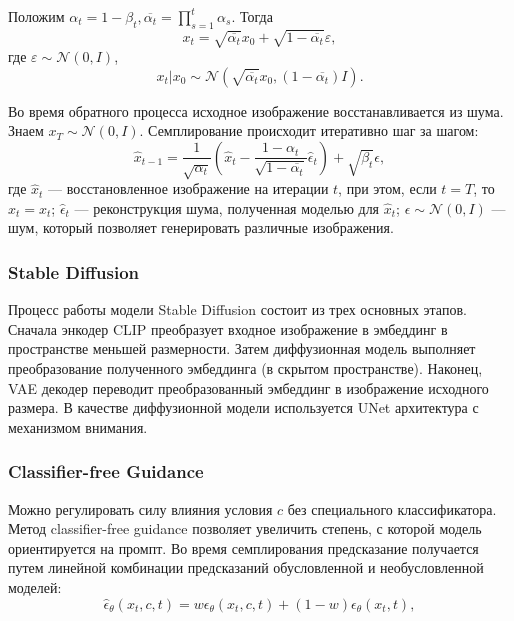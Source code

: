 \documentclass{article}
\begin{document}
Положим $\alpha_t=1-\beta_t, \overline{\alpha_t} = \prod\limits_{s = 1}^t\alpha_s$. Тогда 
\begin{equation}
x_t = \sqrt{\overline{\alpha_t}}x_0+\sqrt{1-\overline{\alpha_t}}\varepsilon,
\end{equation}
где $\varepsilon \sim \mathcal{N}(0, I)$, 
\begin{equation}
x_t|x_0 \sim \mathcal{N}(\sqrt{\overline{\alpha_t}}x_0, (1-\overline{\alpha_t}) I).
\end{equation}

Во время обратного процесса исходное изображение восстанавливается из шума. Знаем $x_T\sim \mathcal{N}(0, I)$. Семплирование происходит итеративно шаг за шагом:
\begin{equation}
\hat{x}_{t-1} = \frac{1}{\sqrt{\alpha_t}}\left( \hat{x}_t - \frac{1-\alpha_t}{\sqrt{1-\overline{\alpha_t}}}\hat{\epsilon}_t\right) + \sqrt{\beta_t}\epsilon,
\end{equation}
где $\hat{x}_t$ --- восстановленное изображение на итерации $t$, при этом, если $t = T$, то $\hat{x}_t = x_t$; $\hat{\epsilon}_t$ --- реконструкция шума, полученная моделью для $\hat{x}_t$; $\epsilon \sim \mathcal{N}(0, I)$ --- шум, который позволяет генерировать различные изображения. 

\subsubsection{Stable Diffusion}
Процесс работы модели Stable Diffusion состоит из трех основных этапов. Сначала энкодер CLIP\cite{DBLP:journals/corr/abs-2103-00020} преобразует входное изображение в эмбеддинг в пространстве меньшей размерности. Затем диффузионная модель выполняет преобразование полученного эмбеддинга (в скрытом пространстве). Наконец, VAE\cite{DBLP:journals/corr/abs-1906-02691} декодер переводит преобразованный эмбеддинг в изображение исходного размера. В качестве диффузионной модели используется UNet\cite{DBLP:journals/corr/RonnebergerFB15} архитектура с механизмом внимания.

\subsubsection{Classifier-free Guidance}
Можно регулировать силу влияния условия $c$ без специального классификатора. Метод classifier-free guidance\cite{ho2022classifierfree} позволяет увеличить степень, с которой модель ориентируется на промпт. Во время семплирования предсказание получается путем линейной комбинации предсказаний обусловленной и необусловленной моделей: 
\begin{equation}
\hat{\epsilon}_{\theta}(x_t, c, t) = w\epsilon_{\theta}(x_t, c, t) + (1-w)\epsilon_{\theta}(x_t, t),
\end{equation}
\end{document}
